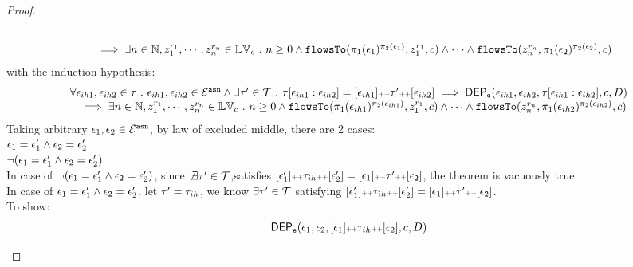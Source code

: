 \begin{proof}
\begin{case}
\[\begin{array}{l}
          \\ \quad 
          \implies 
          \exists n \in \mathbb{N}, z_1^{r_1}, \cdots, z_n^{r_n} \in \mathbb{LV}_{{c}}  ~.~ n \geq 0 \land
          \mathtt{flowsTo}(\pi_1(\mathtt{\epsilon}_1)^{\pi_2(\mathtt{\epsilon}_1)},  z_1^{r_1}, c) 
          \land \cdots \land \mathtt{flowsTo}(z_n^{r_n}, \pi_1(\mathtt{\epsilon}_2)^{\pi_2(\mathtt{\epsilon}_2)}, c) 
        \end{array}
        \]
        with the induction hypothesis:
        \[
          \begin{array}{l}
            \forall \mathtt{\epsilon}_{ih1}, \mathtt{\epsilon}_{ih2} \in \mathtt{\tau}  ~.~ \mathtt{\epsilon}_{ih1}, \mathtt{\epsilon}_{ih2} \in \mathcal{E}^{\mathtt{{asn}}} 
            \land
             \exists \mathtt{\tau}' \in \mathcal{T}  ~.~ 
             \mathtt{\tau}[\mathtt{\epsilon}_{ih1}:\mathtt{\epsilon}_{ih2}] = [\mathtt{\epsilon}_{ih1}] {\scriptscriptstyle ++} \mathtt{\tau}' {\scriptscriptstyle ++} [\mathtt{\epsilon}_{ih2}]
            \implies
            \mathsf{DEP_{\mathtt{e}}}(\mathtt{\epsilon}_{ih1}, \mathtt{\epsilon}_{ih2}, \mathtt{\tau}[\mathtt{\epsilon}_{ih1}:\mathtt{\epsilon}_{ih2}], c, D) 
            \\ \quad 
            \implies 
            \exists n \in \mathbb{N}, z_1^{r_1}, \cdots, z_n^{r_n} \in \mathbb{LV}_{{c}}  ~.~ n \geq 0 \land
            \mathtt{flowsTo}(\pi_1(\mathtt{\epsilon}_{ih1})^{\pi_2(\mathtt{\epsilon}_{ih1})},  z_1^{r_1}, c) 
            \land \cdots \land \mathtt{flowsTo}(z_n^{r_n}, \pi_1(\mathtt{\epsilon}_{ih2})^{\pi_2(\mathtt{\epsilon}_{ih2})}, c) 
          \end{array}
        \]
        Taking arbitrary $ \mathtt{\epsilon}_1, \mathtt{\epsilon}_2 \in \mathcal{E}^{\mathtt{{asn}}}$, by law of excluded middle, there are 2 cases:
        \\
        $\mathtt{\epsilon}_1 = \mathtt{\epsilon}_1' \land  \mathtt{\epsilon}_2 = \mathtt{\epsilon}_2'$
        \\
        $\neg(\mathtt{\epsilon}_1 = \mathtt{\epsilon}_1' \land  \mathtt{\epsilon}_2 = \mathtt{\epsilon}_2')$
        \\
        In case of $\neg(\mathtt{\epsilon}_1 = \mathtt{\epsilon}_1' \land  \mathtt{\epsilon}_2 = \mathtt{\epsilon}_2')$, since 
        $\not\exists \mathtt{\tau}' \in \mathcal{T}$,satisfies $
        [\mathtt{\epsilon}_1'] {\scriptscriptstyle ++} \mathtt{\tau}_{ih} {\scriptscriptstyle ++} [\mathtt{\epsilon}_2']  = [\mathtt{\epsilon}_1] {\scriptscriptstyle ++} \mathtt{\tau}' {\scriptscriptstyle ++} [\mathtt{\epsilon}_2]$, 
        the theorem is vacuously true.
        \\
        In case of $\mathtt{\epsilon}_1 = \mathtt{\epsilon}_1' \land  \mathtt{\epsilon}_2 = \mathtt{\epsilon}_2'$,
        let $\mathtt{\tau}' = \mathtt{\tau}_{ih}$, we know $\exists \mathtt{\tau}' \in \mathcal{T}$ satisfying 
        $[\mathtt{\epsilon}_1'] {\scriptscriptstyle ++} \mathtt{\tau}_{ih} {\scriptscriptstyle ++} [\mathtt{\epsilon}_2'] = [\mathtt{\epsilon}_1] {\scriptscriptstyle ++} \mathtt{\tau}' {\scriptscriptstyle ++} [\mathtt{\epsilon}_2]$.
        \\
        To show:
        \[
          \begin{array}{l}
            \mathsf{DEP_{\mathtt{e}}}(\mathtt{\epsilon}_1, \mathtt{\epsilon}_2, [\mathtt{\epsilon}_1] {\scriptscriptstyle ++} \mathtt{\tau}_{ih} {\scriptscriptstyle ++} [\mathtt{\epsilon}_2], c, D) 

\end{array}\]
\end{case}
\end{proof}
